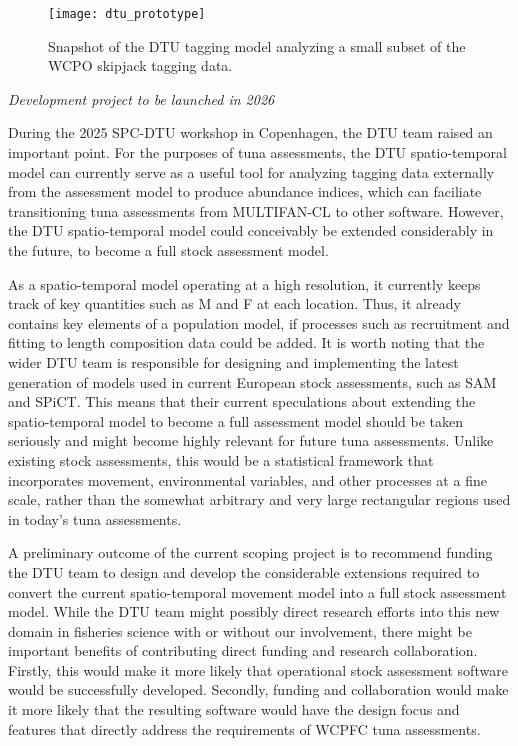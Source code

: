 \documentclass{SCreport}
\begin{document}
\begin{figure}
  \centering
  \texttt{[image: dtu\_prototype]}
  \caption{Snapshot of the DTU tagging model analyzing a small subset of the
    WCPO skipjack tagging data.\label{fig:dtu-prototype}}
\end{figure}

\vspace{2ex}

\textit{Development project to be launched in 2026}

During the 2025 SPC-DTU workshop in Copenhagen, the DTU team raised an important
point. For the purposes of tuna assessments, the DTU spatio-temporal model can
currently serve as a useful tool for analyzing tagging data externally from the
assessment model to produce abundance indices, which can faciliate transitioning
tuna assessments from MULTIFAN-CL to other software. However, the DTU
spatio-temporal model could conceivably be extended considerably in the future,
to become a full stock assessment model.

As a spatio-temporal model operating at a high resolution, it currently keeps
track of key quantities such as M and F at each location. Thus, it already
contains key elements of a population model, if processes such as recruitment
and fitting to length composition data could be added. It is worth noting that
the wider DTU team is responsible for designing and implementing the latest
generation of models used in current European stock assessments, such as SAM and
SPiCT. This means that their current speculations about extending the
spatio-temporal model to become a full assessment model should be taken
seriously and might become highly relevant for future tuna assessments. Unlike
existing stock assessments, this would be a statistical framework that
incorporates movement, environmental variables, and other processes at a fine
scale, rather than the somewhat arbitrary and very large rectangular regions
used in today's tuna assessments.

A preliminary outcome of the current scoping project is to recommend funding the
DTU team to design and develop the considerable extensions required to convert
the current spatio-temporal movement model into a full stock assessment model.
While the DTU team might possibly direct research efforts into this new domain
in fisheries science with or without our involvement, there might be important
benefits of contributing direct funding and research collaboration. Firstly,
this would make it more likely that operational stock assessment software would
be successfully developed. Secondly, funding and collaboration would make it
more likely that the resulting software would have the design focus and features
that directly address the requirements of WCPFC tuna assessments.
\end{document}
